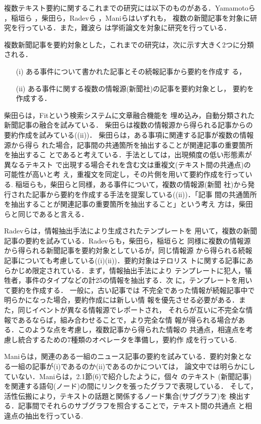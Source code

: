 複数テキスト要約に関するこれまでの研究には以下のものがある．Yamamotoら
\cite{yamamoto:95:b}，稲垣ら
\cite{inagaki:98:b}，柴田ら\cite{sibata:97:a}，Radevら
\cite{radev:98:a}，Maniら\cite{mani:97:a}はいずれも，
複数の新聞記事を対象に研究を行っている．また，難波ら\cite{nanba:99:a}
は学術論文を対象に研究を行っている．

複数新聞記事を要約対象とした，これまでの研究は，次に示す大きく2つに分類
される．
\begin{itemize}
 \item[(i)] ある事件について書かれた記事とその続報記事から要約を作成す
る，
 \item[(ii)] ある事件に関する複数の情報源(新聞社)の記事を要約対象とし，
	    要約を作成する．
\end{itemize}

柴田らは，Fitという検索システムに文章融合機能を
埋め込み，自動分類された新聞記事の融合を試みている．
柴田らは複数の情報源から得られる記事からの要約作成を試みている((ii))．
柴田らは，ある事項に関連する記事が複数の情報源から得ら
れた場合，記事間の共通箇所を抽出することが関連記事の重要箇所を抽出するこ
とであると考えている．手法としては，出現頻度の低い形態素が異なるテキスト
で出現する場合それを含む文は重複文(テキスト間の共通点)の可能性が高いと考
え，重複文を同定し，その片側を用いて要約作成を行っている.
稲垣らも，柴田らと同様，ある事件について，複数の情報源(新聞
社)から発行された記事から要約を作成する手法を提案している((ii))．「記事
間の共通箇所を抽出することが関連記事の重要箇所を抽出すること」という考え
方は，柴田らと同じであると言える．

Radevらは，情報抽出手法により生成されたテンプレートを
用いて，複数の新聞記事の要約を試みている．Radevらも，柴田ら，稲垣らと
同様に複数の情報源から得られる新聞記事を要約対象としているが，同じ情報源
から得られる続報記事についても考慮している((i)(ii))．要約対象はテロリス
トに関する記事にあらかじめ限定されている．まず，情報抽出手法により
テンプレートに犯人，犠牲者，事件のタイプなどの計25の情報を抽出する．次
に，テンプレートを用いて要約を作成する． 一般に，古い記事では
不完全であった情報が続報記事中で明らかになった場合，要約作成には新しい情
報を優先させる必要がある．また，同じイベントが異なる情報源でレポートされ，
それらが互いに不完全な情報であるならば，組み合わせることで，より完全な情
報が得られる場合がある．このような点を考慮し，複数記事から得られた情報の
共通点，相違点を考慮し統合するための7種類のオペレータを準備し，要約作
成を行っている.

Maniらは，関連のある一組のニュース記事の要約を試みている．要約対象とな
る一組の記事が(i)であるのか(ii)であるのかについては，
論文中では明らかにしていない．Maniらは，2.1節(6)で紹介したように，個々
のテキスト
(新聞記事)を関連する語句(ノード)の間にリンクを張ったグラフで表現している．
そして，活性伝搬により，テキストの話題と関係するノード集合(サブグラフ)を
検出する．記事間でそれらのサブグラフを照合することで，テキスト間の共通点
と相違点の抽出を行っている.

